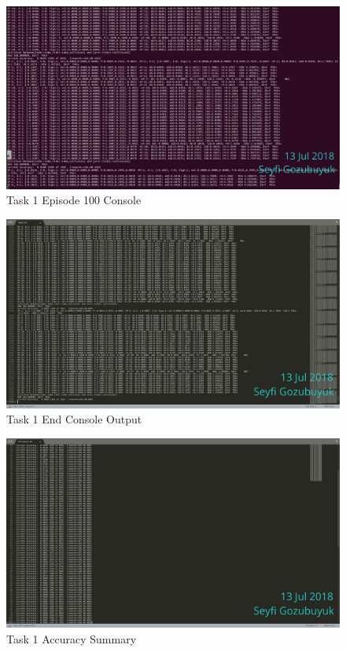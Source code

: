 \documentclass[10pt,journal,compsoc]{IEEEtran}
\begin{document}
\begin{figure}[thpb]
      \centering
      \includegraphics[width=\linewidth]{figures/Task1_Step100_2.png}
      \caption{Task 1 Episode 100 Console}
      \label{fig:t1s1002}
\end{figure}


\begin{figure}[thpb]
      \centering
      \includegraphics[width=\linewidth]{figures/Task1EndConsole.png}
      \caption{Task 1 End Console Output}
      \label{fig:t1ec}
\end{figure}

\begin{figure}[thpb]
      \centering
      \includegraphics[width=\linewidth]{figures/Task1EndAcc.png}
      \caption{Task 1 Accuracy Summary}
      \label{fig:t1as}
\end{figure}
\end{document}

